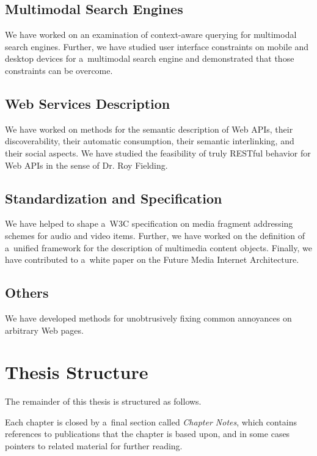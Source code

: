 \subsection{Multimodal Search Engines}

We have worked on an examination of context-aware querying
for multimodal search engines.
Further, we have studied user interface constraints on
mobile and desktop devices for a~multimodal search engine
and demonstrated that those constraints can be overcome.

\subsection{Web Services Description}

We have worked on methods for the semantic description of Web APIs,
their discoverability, their automatic consumption,
their semantic interlinking, and their social aspects.
We have studied the feasibility of truly RESTful behavior
for Web APIs in the sense of Dr. Roy Fielding.
        
\subsection{Standardization and Specification}        
We have helped to shape a~W3C specification on media
fragment addressing schemes for audio and video items.
Further, we have worked on the definition of a~unified framework
for the description of multimedia content objects.
Finally, we have contributed to a~white paper on the
Future Media Internet Architecture.

\subsection{Others}

We have developed methods for unobtrusively fixing
common annoyances on arbitrary Web pages.

\section{Thesis Structure}

The remainder of this thesis is structured as follows. 

Each chapter is closed by a~final section called
\emph{Chapter Notes}, which contains references to publications
that the chapter is based upon,
and in some cases pointers to related material for further reading.



